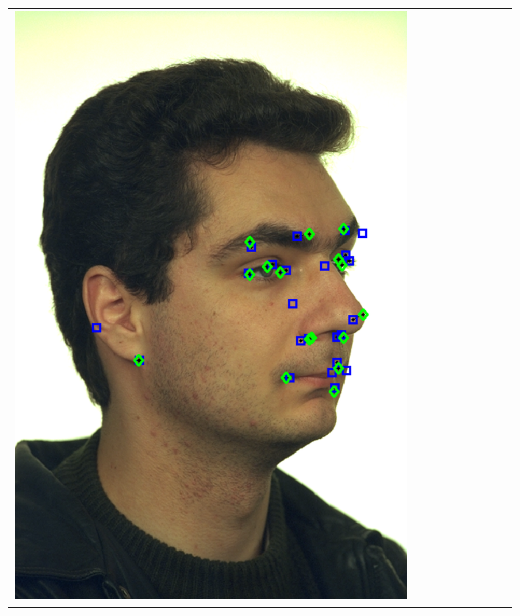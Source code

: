 \documentclass[landscape,final,a0paper,fontscale=0.27065]{baposter}
\begin{document}
\begin{poster}
{{\begin{tabular}{@{}rccccccc@{}}
 \parbox[c]{0.11\linewidth}{\includegraphics[width=\linewidth]{images/l_hr_success_2.pdf}} &

\end{tabular}}}
\end{poster}
\end{document}
